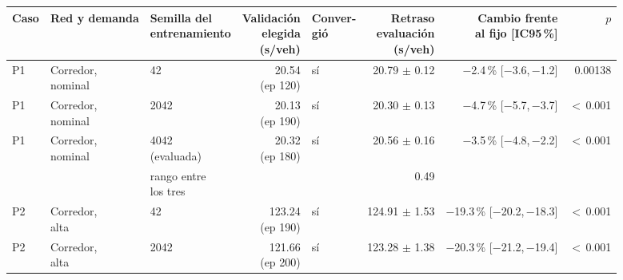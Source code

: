 \begin{table}[H]
\centering
\scriptsize
\setlength{\tabcolsep}{3pt}
\begin{tabular}{lllrlrrr}
\toprule
Caso & Red y demanda & \makecell{Semilla del\\entrenamiento} & \makecell{Validación\\elegida\\(s/veh)} & \makecell{Conver-\\gió} & \makecell{Retraso\\evaluación\\(s/veh)} & \makecell{Cambio frente\\al fijo [IC95\,\%]} & $p$ \\
\midrule
P1 & \makecell[l]{Corredor,\\{}nominal} & 42 & \makecell[r]{20.54\\{}(ep 120)} & sí & \makecell[r]{20.79\\{}$\pm$ 0.12} & \makecell[r]{$-$2.4\,\%\\{}[$-$3.6,\,$-$1.2]} & 0.00138 \\
P1 & \makecell[l]{Corredor,\\{}nominal} & 2042 & \makecell[r]{20.13\\{}(ep 190)} & sí & \makecell[r]{20.30\\{}$\pm$ 0.13} & \makecell[r]{$-$4.7\,\%\\{}[$-$5.7,\,$-$3.7]} & $<$\,0.001 \\
P1 & \makecell[l]{Corredor,\\{}nominal} & \makecell[l]{4042\\{}(evaluada)} & \makecell[r]{20.32\\{}(ep 180)} & sí & \makecell[r]{20.56\\{}$\pm$ 0.16} & \makecell[r]{$-$3.5\,\%\\{}[$-$4.8,\,$-$2.2]} & $<$\,0.001 \\
 & & \makecell[l]{rango entre\\{}los tres} & & & 0.49 & & \\
P2 & \makecell[l]{Corredor,\\{}alta} & 42 & \makecell[r]{123.24\\{}(ep 190)} & sí & \makecell[r]{124.91\\{}$\pm$ 1.53} & \makecell[r]{$-$19.3\,\%\\{}[$-$20.2,\,$-$18.3]} & $<$\,0.001 \\
P2 & \makecell[l]{Corredor,\\{}alta} & 2042 & \makecell[r]{121.66\\{}(ep 200)} & sí & \makecell[r]{123.28\\{}$\pm$ 1.38} & \makecell[r]{$-$20.3\,\%\\{}[$-$21.2,\,$-$19.4]} & $<$\,0.001 \\

\end{tabular}
\end{table}
